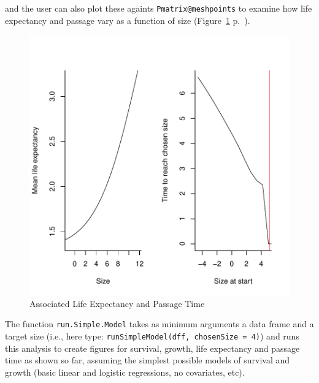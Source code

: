 \documentclass{article}
\begin{document}
\begin{Schunk}
\end{Schunk}
and the user can also plot these againts {\tt Pmatrix@meshpoints} to examine how life expectancy and passage vary as a function of size (Figure~\ref{fig:three} p.~\pageref{fig:three}).
\begin{figure}
\begin{center}
\includegraphics{IPMpack_Vignette-fig3}
\end{center}
\caption{Associated Life Expectancy and Passage Time}
\label{fig:three}
\end{figure}
The function {\tt run.Simple.Model} takes as minimum arguments a data frame and a target size (i.e., here type: {\tt runSimpleModel(dff, chosenSize = 4)}) and runs this analysis to create figures for survival, growth, life expectancy and passage time as shown so far, assuming the simplest possible models of survival and growth (basic linear and logistic regressions, no covariates, etc).
\end{document}
